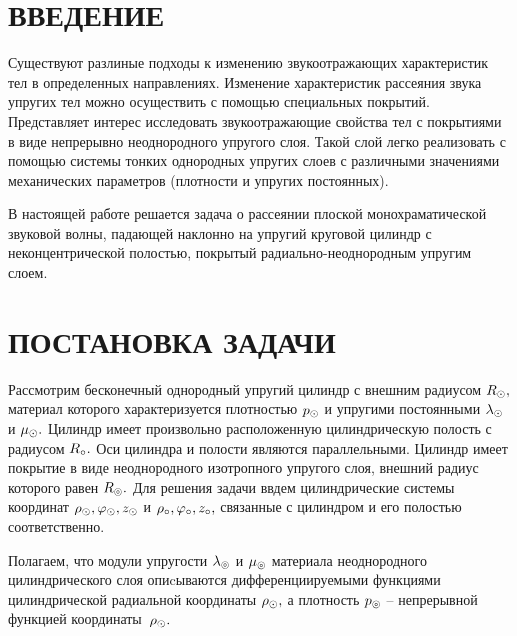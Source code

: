 
 
\renewcommand{\bibname}{СПИСОК ИСПОЛЬЗОВАННЫХ ИСТОЧНИКОВ}
\renewcommand\refname{СПИСОК ИСПОЛЬЗОВАННЫХ ИСТОЧНИКОВ}

%

\setcounter{page}{2}
\thispagestyle {empty}
\renewcommand{\contentsname}{\centering СОДЕРЖАНИЕ}
\tableofcontents

\newpage
\section*{ВВЕДЕНИЕ}

Существуют разлиные подходы к изменению звукоотражающих характеристик тел в определенных направлениях. Изменение характеристик рассеяния звука упругих тел можно осуществить с помощью специальных покрытий. Представляет интерес исследовать звукоотражающие свойства тел с покрытиями в виде непрерывно неоднородного упругого слоя. Такой слой легко реализовать с помощью системы тонких однородных упругих слоев с различными значениями механических параметров (плотности и упругих постоянных).

В настоящей работе решается задача о рассеянии плоской монохраматической звуковой волны, падающей наклонно на упругий круговой цилиндр с неконцентрической полостью, покрытый радиально-неоднородным упругим слоем.

\newpage
\section{ПОСТАНОВКА ЗАДАЧИ} 

Рассмотрим бесконечный однородный упругий цилиндр с внешним радиусом $R_\odot,$ материал которого характеризуется плотностью $p_\odot$ и упругими постоянными $\lambda_\odot$ и $\mu_\odot.$ Цилиндр имеет произвольно расположенную цилиндрическую полость с радиусом $R_\circ.$ Оси цилиндра и полости являются параллельными. Цилиндр имеет покрытие в виде неоднородного изотропного упругого слоя, внешний радиус которого равен $R_\circledcirc.$ Для решения задачи ввдем цилиндрические системы координат $\rho_\odot, \varphi_\odot, z_\odot$ и $\rho_\circ, \varphi_\circ, z_\circ,$ связанные с цилиндром и его полостью соответственно.

Полагаем, что модули упругости $\lambda_\circledcirc$ и $\mu_\circledcirc$ материала неоднородного цилиндрического слоя опиcываются дифференциируемыми функциями цилиндрической радиальной координаты $\rho_\odot,$ а плотность $p_\circledcirc$ -- непрерывной функцией координаты~$\rho_\odot.$ 

